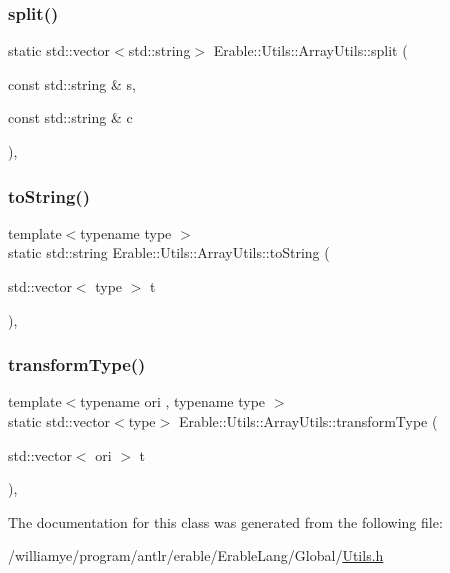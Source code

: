 \mbox{\label{class_erable_1_1_utils_1_1_array_utils_a0480c779e520d62c2acec66d67a103e2}} 
\subsubsection{\texorpdfstring{split()}{split()}}
{\footnotesize\ttfamily static std\+::vector$<$std\+::string$>$ Erable\+::\+Utils\+::\+Array\+Utils\+::split (\begin{DoxyParamCaption}\item[{const std\+::string \&}]{s,  }\item[{const std\+::string \&}]{c }\end{DoxyParamCaption})\hspace{0.3cm}{\ttfamily [inline]}, {\ttfamily [static]}}

\mbox{\label{class_erable_1_1_utils_1_1_array_utils_a0ee1760ed1a3f4e4607df01dcdfffa38}} 
\subsubsection{\texorpdfstring{toString()}{toString()}}
{\footnotesize\ttfamily template$<$typename type $>$ \\
static std\+::string Erable\+::\+Utils\+::\+Array\+Utils\+::to\+String (\begin{DoxyParamCaption}\item[{std\+::vector$<$ type $>$}]{t }\end{DoxyParamCaption})\hspace{0.3cm}{\ttfamily [inline]}, {\ttfamily [static]}}

\mbox{\label{class_erable_1_1_utils_1_1_array_utils_ade18152992f91c71633e2fdbaad9ac7d}} 
\subsubsection{\texorpdfstring{transformType()}{transformType()}}
{\footnotesize\ttfamily template$<$typename ori , typename type $>$ \\
static std\+::vector$<$type$>$ Erable\+::\+Utils\+::\+Array\+Utils\+::transform\+Type (\begin{DoxyParamCaption}\item[{std\+::vector$<$ ori $>$}]{t }\end{DoxyParamCaption})\hspace{0.3cm}{\ttfamily [inline]}, {\ttfamily [static]}}



The documentation for this class was generated from the following file\+:\begin{DoxyCompactItemize}
\item 
/williamye/program/antlr/erable/\+Erable\+Lang/\+Global/\mbox{\hyperlink{_utils_8h}{Utils.\+h}}\end{DoxyCompactItemize}
